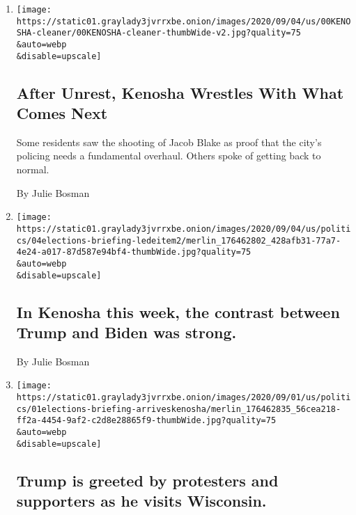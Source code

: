 \begin{enumerate}
\def\labelenumi{\arabic{enumi}.}
\item
  \href{/2020/09/06/us/kenosha-jacob-blake.html}{}

  \texttt{[image: https://static01.graylady3jvrrxbe.onion/images/2020/09/04/us/00KENOSHA-cleaner/00KENOSHA-cleaner-thumbWide-v2.jpg?quality=75\\\&auto=webp\\\&disable=upscale]}

  \hypertarget{after-unrest-kenosha-wrestles-with-what-comes-next}{%
  \subsection{After Unrest, Kenosha Wrestles With What Comes
  Next}\label{after-unrest-kenosha-wrestles-with-what-comes-next}}

  Some residents saw the shooting of Jacob Blake as proof that the
  city's policing needs a fundamental overhaul. Others spoke of getting
  back to normal.

  By Julie Bosman
\item
  \href{/2020/09/04/us/elections/in-kenosha-this-week-the-contrast-between-trump-and-biden-was-strong.html}{}

  \texttt{[image: https://static01.graylady3jvrrxbe.onion/images/2020/09/04/us/politics/04elections-briefing-ledeitem2/merlin\_176462802\_428afb31-77a7-4e24-a017-87d587e94bf4-thumbWide.jpg?quality=75\\\&auto=webp\\\&disable=upscale]}

  \hypertarget{in-kenosha-this-week-the-contrast-between-trump-and-biden-was-strong}{%
  \subsection{In Kenosha this week, the contrast between Trump and Biden
  was
  strong.}\label{in-kenosha-this-week-the-contrast-between-trump-and-biden-was-strong}}

  By Julie Bosman
\item
  \href{/live/2020/09/01/us/trump-vs-biden/trump-is-greeted-by-protesters-and-supporters-as-he-visits-wisconsin}{}

  \texttt{[image: https://static01.graylady3jvrrxbe.onion/images/2020/09/01/us/politics/01elections-briefing-arriveskenosha/merlin\_176462835\_56cea218-ff2a-4454-9af2-c2d8e28865f9-thumbWide.jpg?quality=75\\\&auto=webp\\\&disable=upscale]}

  \hypertarget{trump-is-greeted-by-protesters-and-supporters-as-he-visits-wisconsin}{%
  \subsection{Trump is greeted by protesters and supporters as he visits
  Wisconsin.}\label{trump-is-greeted-by-protesters-and-supporters-as-he-visits-wisconsin}}


\end{enumerate}
